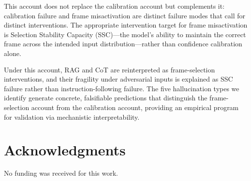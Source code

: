 \documentclass[12pt]{article}
\begin{document}
This account does not replace the calibration account but
complements it: calibration failure and frame misactivation
are distinct failure modes that call for distinct interventions.
The appropriate intervention target for frame misactivation
is Selection Stability Capacity (SSC)---the model's ability
to maintain the correct frame across the intended input
distribution---rather than confidence calibration alone.

Under this account, RAG and CoT are reinterpreted as
frame-selection interventions, and their fragility under
adversarial inputs is explained as SSC failure rather than
instruction-following failure. The five hallucination types
we identify generate concrete, falsifiable predictions that
distinguish the frame-selection account from the calibration
account, providing an empirical program for validation via
mechanistic interpretability.

\section*{Acknowledgments}

No funding was received for this work.
\end{document}
